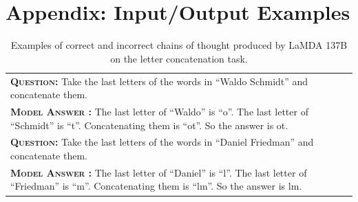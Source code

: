 \documentclass[]{article}
\newcommand{\xmark}{\ding{55}}%
\theoremstyle{plain}
\theoremstyle{definition}
\theoremstyle{remark}
\newcommand{\lamda}[0]{LaMDA}
\begin{document}
\clearpage
\section{Appendix: Input/Output Examples}\label{sec:appendix-input-output-examples}
\begingroup
\begin{table}[h]
    \centering
    \small
    \caption{
    Examples of correct and incorrect chains of thought produced by \lamda{} 137B on the letter concatenation task.
    }
    \begin{tabular}{p{\linewidth}}
        \toprule
        \vspace{-2mm}
        \textbf{\textsc{Question:}} Take the last letters of the words in ``Waldo Schmidt'' and concatenate them. \\
        \vspace{-1mm}
        \textbf{\textsc{Model Answer \color{darkGreen}{(CORRECT)}:}} The last letter of ``Waldo'' is ``o''. The last letter of ``Schmidt'' is ``t''. Concatenating them is ``ot''. So the answer is ot. \color{darkGreen}{\checkmark} \\
        \midrule
        \vspace{-2mm}
        \textbf{\textsc{Question:}} Take the last letters of the words in ``Daniel Friedman'' and concatenate them. \\
        \vspace{-1mm}
        \textbf{\textsc{Model Answer \color{blue}{(INCORRECT)}:}} The last letter of ``Daniel'' is ``l''. The {\color{blue} last letter of ``Friedman'' is ``m''.} Concatenating them is ``lm''. So the answer is lm. \color{blue}{\xmark} \\
        \bottomrule
    \end{tabular}
    \label{tab:appendix-letter-concat-examples}
\end{table}
\endgroup
{}
\begingroup
\end{document}
